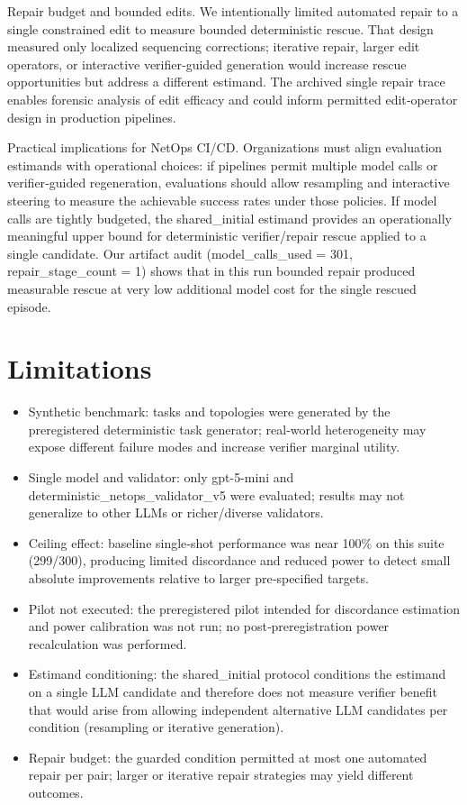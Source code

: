 \documentclass[conference]{IEEEtran}
\begin{document}
Repair budget and bounded edits. We intentionally limited automated repair to a single constrained edit to measure bounded deterministic rescue. That design measured only localized sequencing corrections; iterative repair, larger edit operators, or interactive verifier‑guided generation would increase rescue opportunities but address a different estimand. The archived single repair trace enables forensic analysis of edit efficacy and could inform permitted edit‑operator design in production pipelines.

Practical implications for NetOps CI/CD. Organizations must align evaluation estimands with operational choices: if pipelines permit multiple model calls or verifier‑guided regeneration, evaluations should allow resampling and interactive steering to measure the achievable success rates under those policies. If model calls are tightly budgeted, the shared\_initial estimand provides an operationally meaningful upper bound for deterministic verifier/repair rescue applied to a single candidate. Our artifact audit (model\_calls\_used = 301, repair\_stage\_count = 1) shows that in this run bounded repair produced measurable rescue at very low additional model cost for the single rescued episode.

\section{Limitations}
\begin{itemize}
\item Synthetic benchmark: tasks and topologies were generated by the preregistered deterministic task generator; real‑world heterogeneity may expose different failure modes and increase verifier marginal utility.
\item Single model and validator: only gpt-5-mini and deterministic\_netops\_validator\_v5 were evaluated; results may not generalize to other LLMs or richer/diverse validators.
\item Ceiling effect: baseline single‑shot performance was near 100\% on this suite (299/300), producing limited discordance and reduced power to detect small absolute improvements relative to larger pre‑specified targets.
\item Pilot not executed: the preregistered pilot intended for discordance estimation and power calibration was not run; no post‑preregistration power recalculation was performed.
\item Estimand conditioning: the shared\_initial protocol conditions the estimand on a single LLM candidate and therefore does not measure verifier benefit that would arise from allowing independent alternative LLM candidates per condition (resampling or iterative generation).
\item Repair budget: the guarded condition permitted at most one automated repair per pair; larger or iterative repair strategies may yield different outcomes.
\end{itemize}
\end{document}
